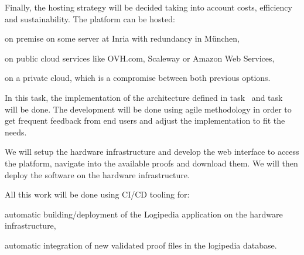 \begin{workpackage}[id=access,type=RTD,wphases=1-48,
  short=Access,%
  title={Access},
  lead=Inr,InrRM=48,OcaRM=6,EduRM=12]
\begin{tasklist}
{\begin{task}[id=infra,
      title=Defining the hardware architecture for the infrastructure,
      shorttitle=Defining the hardware architecture for the infrastructure,
      lead=Inr,InrRM=1,wphases=6-7]
    Finally, the hosting strategy will be decided taking into account
    costs, efficiency and sustainability.  The platform can be hosted:
    \begin{compactitem}
    \item on premise on some server at Inria with redundancy in München,
    \item on public cloud services like OVH.com, Scaleway or Amazon
      Web Services,
    \item on a private cloud, which is a compromise between both
      previous options.
    \end{compactitem}
  \end{task}

  \begin{task}[id=web,
      title=Giving access to the infrastructure on the world-wide web,
      shorttitle=Giving access to the infrastructure on the world-wide web,
      lead=Inr,InrRM=18,,wphases=8-27]
    In this task, the implementation of the architecture defined in
    task~ and task~ will
    be done. The development will be done using agile methodology in
    order to get frequent feedback from end users and adjust the
    implementation to fit the needs.

    We will setup the hardware infrastructure and develop the web
    interface to access the platform, navigate into the available
    proofs and download them.  We will then deploy the software on the
    hardware infrastructure.

    All this work will be done using CI/CD tooling for:
    \begin{compactitem}
    \item automatic building/deployment of the Logipedia application
      on the hardware infrastructure,
    \item automatic integration of new validated proof files in the
      logipedia database.
    \end{compactitem}


\end{task}}
\end{tasklist}
\end{workpackage}
